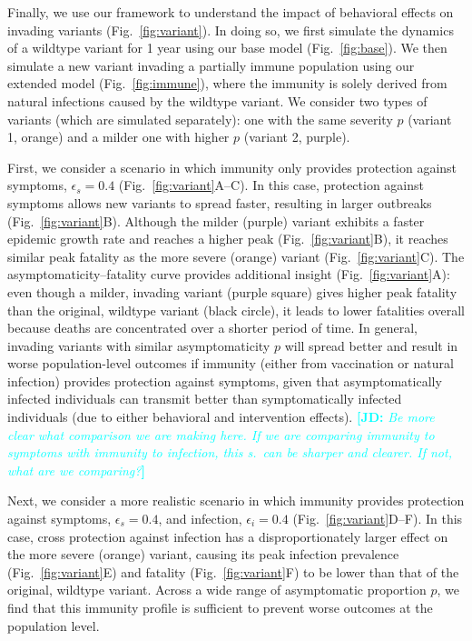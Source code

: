 \documentclass[12pt]{article}
\newcommand{\comment}{\showcomment}
\newcommand{\showcomment}[3]{\textcolor{#1}{\textbf{[#2: }\textsl{#3}\textbf{]}}}
\newcommand{\jd}[1]{\comment{cyan}{JD}{#1}}
\newcommand{\fref}[1]{Fig.~\ref{fig:#1}}
\begin{document}
Finally, we use our framework to understand the impact of behavioral effects on invading variants (\fref{variant}).
In doing so, we first simulate the dynamics of a wildtype variant for 1 year using our base model (\fref{base}).
We then simulate a new variant invading a partially immune population using our extended model (\fref{immune}), where the immunity is solely derived from natural infections caused by the wildtype variant.
We consider two types of variants (which are simulated separately): one with the same severity $p$ (variant 1, orange) and a milder one with higher $p$ (variant 2, purple).

First, we consider a scenario in which immunity only provides protection against symptoms, $\epsilon_s = 0.4$ (\fref{variant}A--C).
In this case, protection against symptoms allows new variants to spread faster, resulting in larger outbreaks (\fref{variant}B).
Although the milder (purple) variant exhibits a faster epidemic growth rate and reaches a higher peak (\fref{variant}B), it reaches similar peak fatality as the more severe (orange) variant (\fref{variant}C).
The asymptomaticity--fatality curve provides additional insight (\fref{variant}A): even though a milder, invading variant (purple square) gives higher peak fatality than the original, wildtype variant (black circle), it leads to lower fatalities overall because deaths are concentrated over a shorter period of time.
In general, invading variants with similar asymptomaticity $p$ will spread better and result in worse population-level outcomes if immunity (either from vaccination or natural infection) provides protection against symptoms, given that asymptomatically infected individuals can transmit better than symptomatically infected individuals (due to either behavioral and intervention effects).
\jd{Be more clear what comparison we are making here. If we are comparing immunity to symptoms with immunity to infection, this s.~can be sharper and clearer. If not, what are we comparing?}

Next, we consider a more realistic scenario in which immunity provides protection against symptoms, $\epsilon_s = 0.4$, and infection, $\epsilon_i = 0.4$ (\fref{variant}D--F).
In this case, cross protection against infection has a disproportionately larger effect on the more severe (orange) variant, causing its peak infection prevalence (\fref{variant}E) and fatality (\fref{variant}F) to be lower than that of the original, wildtype variant.
Across a wide range of asymptomatic proportion $p$, we find that this immunity profile is sufficient to prevent worse outcomes at the population level.
\end{document}
